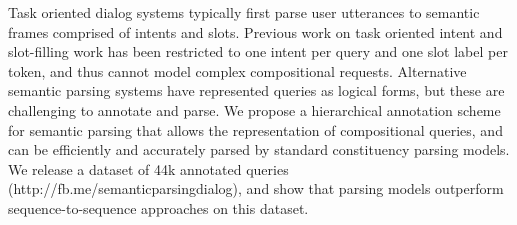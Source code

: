 Task oriented dialog systems typically first parse user utterances to semantic frames comprised of intents and slots. Previous work on task oriented intent and slot-filling work has been restricted to one intent per query and one slot label per token, and thus cannot model complex compositional requests. Alternative semantic parsing systems have represented queries as logical forms, but these are challenging to annotate and parse. We propose a hierarchical annotation scheme for semantic parsing that allows the representation of compositional queries, and can be efficiently and accurately parsed by standard constituency parsing models. We release a dataset of 44k annotated queries (http://fb.me/semanticparsingdialog), and show that parsing models outperform sequence-to-sequence approaches on this dataset.
